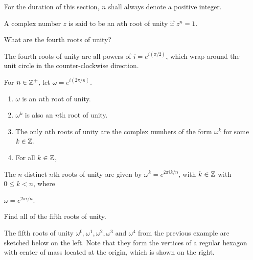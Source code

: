 \documentclass[11pt,fleqn,dvipsnames,usenames]{article}
\newcommand{\p}{\noindent}
\begin{document}
\p For the duration of this section, $n$ shall always denote a positive integer.
%
\begin{definition*}
A complex number $z$ is said to be an $n$th root of unity if $z^{n} = 1$.
\end{definition*}
%
\begin{example*}
What are the fourth roots of unity?
\end{example*}
%
\begin{solution}
\end{solution}
\newpage

\note The fourth roots of unity are all powers of $i = e^{i(\pi/2)}$, which wrap around the unit circle in the counter-clockwise direction.
\vsp

\observations For $n\in\mathbb{Z}^{+}$, let $\omega = e^{i(2\pi/n)}$.
\begin{enumerate}[(1)]
\item $\omega$ is an $n$th root of unity.
\vspace{2cm}

\item $\omega^{k}$ is also an $n$th root of unity.
\vspace{2cm}

\item The only $n$th roots of unity are the complex numbers of the form $\omega^{k}$ for some $k\in\mathbb{Z}$.
\vspace{5cm}

\item For all $k\in\mathbb{Z}$,
\vsp
\end{enumerate}

\begin{theorem*}\label{rootsofunityclassification}
The $n$ distinct $n$th roots of unity are given by $\omega^{k} = e^{2\pi i k/n}$, with $k\in\mathbb{Z}$ with $0\leq k < n$, where
\begin{center}
$\omega = e^{2\pi i/n}$.
\end{center}
\end{theorem*}
\vsp

\begin{example*}\label{fifthrootsunityexample}
Find all of the fifth roots of unity.
\end{example*}
%
\begin{solution}
\end{solution}
\newpage

\p The fifth roots of unity $\omega^{0}, \omega^{1}, \omega^{2},\omega^{3}$ and $\omega^{4}$ from the previous example are sketched below on the left.  Note that they form the vertices of a regular hexagon with center of mass located at the origin, which is shown on the right.
\end{document}
